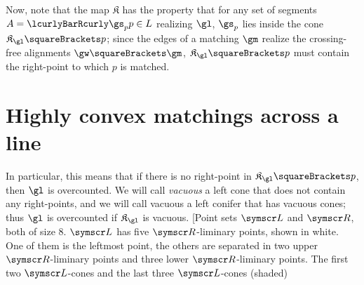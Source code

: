 \documentclass[10pt, a4paper, twoside]{basestyle}
\newcommand{\pointset}{\symscr}
\newcommand{\conification}{\mathfrak{K}}
\begin{document}
Now, note that
the map $\conification$ has the property that for any set of segments $A=\setst{\gs_p}{p\in L}$ realizing $\gl$,
$\gs_p$ lies inside the cone $\conification_\gl\of{p}$; since the edges of a matching $\gm$ realize the crossing-free
alignments $\gw\of{\gm}$, $\conification_\gl\of{p}$ must contain the right-point to which $p$ is matched.

\section{Highly convex matchings across a line}
\label{sectionHighlyConvex}
In particular, this means that if there is no right-point in $\conification_\gl\of{p}$,
then $\gl$ is overcounted.
We will call \emph{vacuous} a left cone that does not contain any right-points,
and we will call vacuous a left conifer that has vacuous cones; thus $\gl$ is overcounted
if $\conification_\gl$ is vacuous.
\marginfig[Point sets $\pointset L$ and $\pointset R$, both
of size $8$. $\pointset L$ has five $\pointset R$-liminary points, shown in
white. One of them is the leftmost point, the others are separated in two
upper $\pointset R$-liminary points and three lower $\pointset R$-liminary points.
The first two $\pointset L$-cones and the last three $\pointset L$-cones (shaded)
\end{document}
